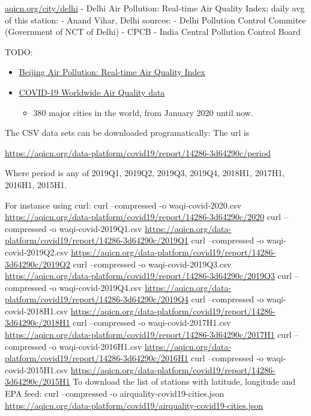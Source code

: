 \documentclass[]{book}
\providecommand{\tightlist}{%
  \setlength{\itemsep}{0pt}\setlength{\parskip}{0pt}}
\begin{document}
\href{https://aqicn.org/city/delhi/}{aqicn.org/city/delhi} - Delhi Air Pollution: Real-time Air Quality Index; daily avg of this station:
- Anand Vihar, Delhi
sources:
- Delhi Pollution Control Commitee (Government of NCT of Delhi)
- CPCB - India Central Pollution Control Board

TODO:

\begin{itemize}
\tightlist
\item
  \href{https://aqicn.org/city/beijing/}{Beijing Air Pollution: Real-time Air Quality Index}
\item
  \href{https://aqicn.org/data-platform/covid19/}{COVID-19 Worldwide Air Quality data}

  \begin{itemize}
  \tightlist
  \item
    380 major cities in the world, from January 2020 until now.
  \end{itemize}
\end{itemize}

The CSV data sets can be downloaded programatically: The url is

\url{https://aqicn.org/data-platform/covid19/report/14286-3d64290c/period}

Where period is any of 2019Q1, 2019Q2, 2019Q3, 2019Q4, 2018H1, 2017H1, 2016H1, 2015H1.

For instance using curl:
curl --compressed -o waqi-covid-2020.csv \url{https://aqicn.org/data-platform/covid19/report/14286-3d64290c/2020}
curl --compressed -o waqi-covid-2019Q1.csv \url{https://aqicn.org/data-platform/covid19/report/14286-3d64290c/2019Q1}
curl --compressed -o waqi-covid-2019Q2.csv \url{https://aqicn.org/data-platform/covid19/report/14286-3d64290c/2019Q2}
curl --compressed -o waqi-covid-2019Q3.csv \url{https://aqicn.org/data-platform/covid19/report/14286-3d64290c/2019Q3}
curl --compressed -o waqi-covid-2019Q4.csv \url{https://aqicn.org/data-platform/covid19/report/14286-3d64290c/2019Q4}
curl --compressed -o waqi-covid-2018H1.csv \url{https://aqicn.org/data-platform/covid19/report/14286-3d64290c/2018H1}
curl --compressed -o waqi-covid-2017H1.csv \url{https://aqicn.org/data-platform/covid19/report/14286-3d64290c/2017H1}
curl --compressed -o waqi-covid-2016H1.csv \url{https://aqicn.org/data-platform/covid19/report/14286-3d64290c/2016H1}
curl --compressed -o waqi-covid-2015H1.csv \url{https://aqicn.org/data-platform/covid19/report/14286-3d64290c/2015H1}
To download the list of stations with latitude, longitude and EPA feed:
curl --compressed -o airquality-covid19-cities.json \url{https://aqicn.org/data-platform/covid19/airquality-covid19-cities.json}
\end{document}
